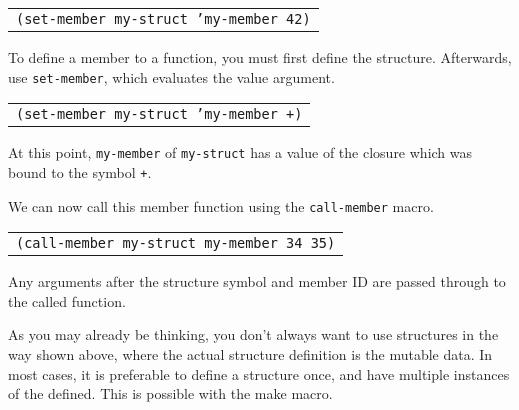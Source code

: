 \documentclass[
letterpaper,
oneside,
]{memoir}
\begin{document}
\vspace{1em}
\begin{tabular}{l}
  \texttt{(set-member my-struct 'my-member 42)} \\
\end{tabular}
\vspace{1em}

\filbreak

\noindent
To define a member to a function, you must first define the structure. Afterwards, use \texttt{set-member}, which evaluates the value argument.

\vspace{1em}
\begin{tabular}{l}
  \texttt{(set-member my-struct 'my-member +)} \\
\end{tabular}
\vspace{1em}

\noindent
At this point, \texttt{my-member} of \texttt{my-struct} has a value of the closure which was bound to the symbol \texttt{+}.

\filbreak

\vspace{1em}
\noindent
We can now call this member function using the \texttt{call-member} macro.

\vspace{1em}
\begin{tabular}{l}
  \texttt{(call-member my-struct my-member 34 35)} \\
\end{tabular}
\vspace{1em}

\noindent
Any arguments after the structure symbol and member ID are passed through to the called function.

\clearpage

As you may already be thinking, you don’t always want to use structures in the way shown above, where the actual structure definition is the mutable data. In most cases, it is preferable to define a structure once, and have multiple instances of the defined. This is possible with the make macro.
\end{document}
